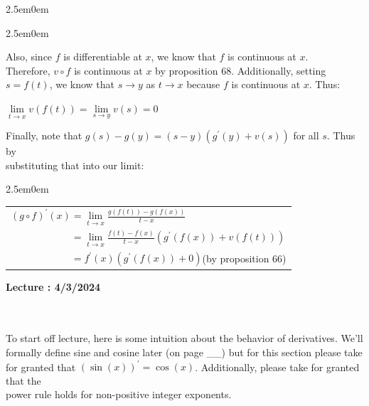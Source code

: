 \documentclass{book}
\newcommand{\exOne}{%
   \color{Purple}%
   \fontsize{14}{16}\selectfont%
}
\newenvironment{myIndent}{%
   \begin{adjustwidth}{2.5em}{0em}%
}{%
   \end{adjustwidth}%
}
\newcommand{\mySepTwo}[1][.]{%
   {\noindent\color{#1}{\rule{6.5in}{0.5mm}}}\\%
}
\newcommand{\retTwo}{\hfill\bigbreak}
\newcounter{LectureNumber}
\newcommand*{\markLecture}[1]{%
   \stepcounter{LectureNumber}%
   {\huge \color{Black} \textbf{Lecture \theLectureNumber: #1} \newline}%
}
\begin{document}
{\begin{myIndent}
{\begin{myIndent}
      \newpage

      Also, since $f$ is differentiable at $x$, we know that $f$ is continuous at $x$.\\ Therefore, $v \circ f$ is continuous at $x$ by proposition 68. Additionally, setting\\ $s = f(t)$, we know that $s \rightarrow y$ as $t \rightarrow x$ because $f$ is continuous at $x$. Thus:

      {\center $ \lim\limits_{t\rightarrow x}v(f(t)) = \lim\limits_{s\rightarrow y}v(s) = 0$ \retTwo\par}
      
      Finally, note that $g(s) - g(y) = (s-y)(g^\prime(y) + v(s))$ for all $s$. Thus by\\ substituting that into our limit:\\ [-8pt]
      \begin{myIndent}
         \begin{tabular}{l}
            $(g \circ f)^\prime(x) = \lim\limits_{t\rightarrow x}\frac{g(f(t)) - g(f(x))}{t - x}$ \\ [8pt]
            $\phantom{(g \circ f)^\prime(x) } = \lim\limits_{t\rightarrow x}\frac{f(t) - f(x)}{t - x}(g^\prime(f(x)) + v(f(t)))$ \\ [8pt]
            $\phantom{(g \circ f)^\prime(x) } = f^\prime(x)\left(g^\prime(f(x)) + 0\right)$\quad\quad (by proposition 66)
         \end{tabular}\retTwo
      \end{myIndent}
   \end{myIndent}}
\end{myIndent}}

\markLecture{4/3/2024}
\exOne\mySepTwo\\ [-12pt]
To start off lecture, here is some intuition about the behavior of derivatives. We'll\\ formally define sine and cosine later (on page \_\_) but for this section please take\\ for granted that $(\sin(x))^\prime = \cos(x)$. Additionally, please take for granted that the\\ power rule holds for non-positive integer exponents.\retTwo
\end{document}
